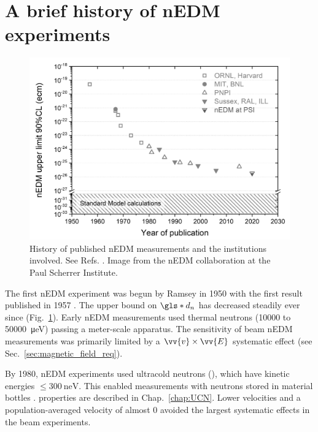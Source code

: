 
\section{A brief history of nEDM experiments}\label{sec:history_nedm}


\begin{figure}[htp]
    \centering
    \includegraphics[width=0.75 \textwidth]{figures/nEDM-history.jpg}
    \caption[History of published nEDM measurements and the institutions involved.]{History of published nEDM measurements and the institutions involved. See Refs. \cite{ramsey_nedm_1950, ramsey_nedm_1957, miller_nedm_1967, baird_nedm_1969, cohen_nedm_1969, dress_nedm_1977, altarev_nedm_1980, altarev_nedm_1981, smith_nedm_1990, BAK06, ABE20}. Image from the nEDM collaboration at the Paul Scherrer Institute.}
    \label{fig:nEDM-history}
\end{figure}

The first nEDM experiment was begun by Ramsey in 1950 with the first result published in 1957 \cite{ramsey_nedm_1950, ramsey_nedm_1957}. The upper bound on $\gls*{d_n}$ has decreased steadily ever since (Fig.~\ref{fig:nEDM-history}). Early nEDM measurements \cite{miller_nedm_1967, baird_nedm_1969, cohen_nedm_1969, dress_nedm_1977} used thermal neutrons (\num{10000} to \qty{50000}{\micro \eV}) passing a meter-scale apparatus. The sensitivity of beam nEDM measurements was primarily limited by a $\vv{v}\times\vv{E}$ systematic effect (see Sec.~\ref{sec:magnetic_field_req}).

By 1980, nEDM experiments \cite{altarev_nedm_1980, altarev_nedm_1981} used ultracold neutrons (\ucn), which have kinetic energies $\leq \qty{300}{\nano\eV}$. This enabled measurements with neutrons stored in material bottles \cite{smith_nedm_1990}. \ucn properties are described in Chap.~\ref{chap:UCN}. Lower \ucn velocities and a population-averaged velocity of almost 0 avoided the largest systematic effects in the beam experiments. 


